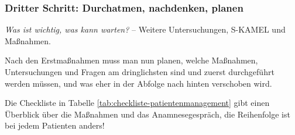 

\subsubsection{Dritter Schritt: Durchatmen, nachdenken,
planen}

\emph{Was ist wichtig, was kann warten?} -- Weitere Untersuchungen, S-KAMEL und
Maßnahmen.

Nach den Erstmaßnahmen muss man nun planen, welche Maßnahmen,
Untersuchungen und Fragen am dringlichsten sind und zuerst durchgeführt
werden müssen, und was eher in der Abfolge nach hinten ver\-schoben
wird. 

Die Checkliste in Tabelle \ref{tab:checkliste-patientenmanagement} gibt
einen Überblick über die Maßnahmen und das Anamnese\-ge\-spräch, die
Reihenfolge ist bei jedem Patienten anders!


